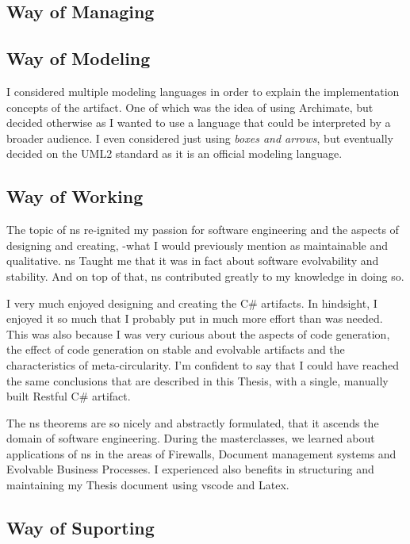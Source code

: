 \subsection{Way of Managing}


\subsection{Way of Modeling}

I considered multiple modeling languages in order to explain the implementation concepts
of the artifact. One of which was the idea of using Archimate, but decided otherwise as I
wanted to use a language that could be interpreted by a broader audience. I even
considered just using \emph{boxes and arrows}, but eventually decided on the UML2 standard
as it is an official modeling language.

\subsection{Way of Working}

The topic of \gls{ns} re-ignited my passion for software engineering and the aspects of
designing and creating, -what I would previously mention as maintainable and qualitative.
\gls{ns} Taught me that it was in fact about software evolvability and stability. And on
top of that, \gls{ns} contributed greatly to my knowledge in doing so.

I very much enjoyed designing and creating the C\# artifacts. In hindsight, I enjoyed it
so much that I probably put in much more effort than was needed. This was also because I
was very curious about the aspects of code generation, the effect of code generation on
stable and evolvable artifacts and the characteristics of meta-circularity. I'm confident
to say that I could have reached the same conclusions that are described in this Thesis,
with a single, manually built Restful C\# artifact.

The \gls{ns} theorems are so nicely and abstractly formulated, that it ascends the domain
of software engineering. During the masterclasses, we learned about applications of
\gls{ns} in the areas of Firewalls, Document management systems and Evolvable Business
Processes. I experienced also benefits in structuring and maintaining my Thesis document
using \gls{vscode} and Latex. 

\subsection{Way of Suporting}

